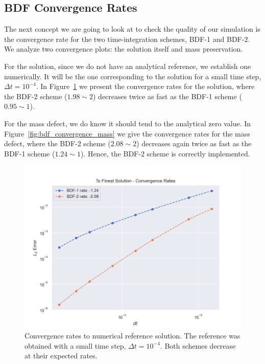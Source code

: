 \documentclass[../../thesis.tex]{subfiles}
\begin{document}
\subsection{BDF Convergence Rates}
\label{sec:fom_calibration_bdf_convergence_rates}
The next concept we are going to look at to check the quality of our simulation is 
the convergence rate for the two time-integration schemes, BDF-1 and BDF-2.
We analyze two convergence plots: the solution itself and mass preservation.

For the solution, since we do not have an analytical reference, 
we establish one numerically.
It will be the one corresponding to the solution for a small time step, 
$\Delta t = 10^{-4}$.
In Figure~\ref{fig:bdf_convergence_solutions} we present the convergence rates for the solution,
where the BDF-2 scheme ($1.98 \sim 2$) decreases twice as fast as the BDF-1 scheme ($0.95 \sim 1$).

For the mass defect, we do know it should tend to the analytical zero value.
In Figure~\ref{fig:bdf_convergence_mass} we give the convergence rates for the mass defect,
where the BDF-2 scheme ($2.08 \sim 2$) decreases again twice as fast as the BDF-1 scheme ($1.24 \sim 1$).
Hence, the BDF-2 scheme is correctly implemented.
\begin{figure}[h]
    \centering
    \includegraphics[width=1\columnwidth]{research_project/piston/figures/bdf_convergence/convergence_finest_solution.png}
    \caption{Convergence rates to numerical reference solution.
    The reference was obtained with a small time step, $\Delta t = 10^{-4}$.
    Both schemes decrease at their expected rates.}
    \label{fig:bdf_convergence_solutions}
\end{figure}
\end{document}
